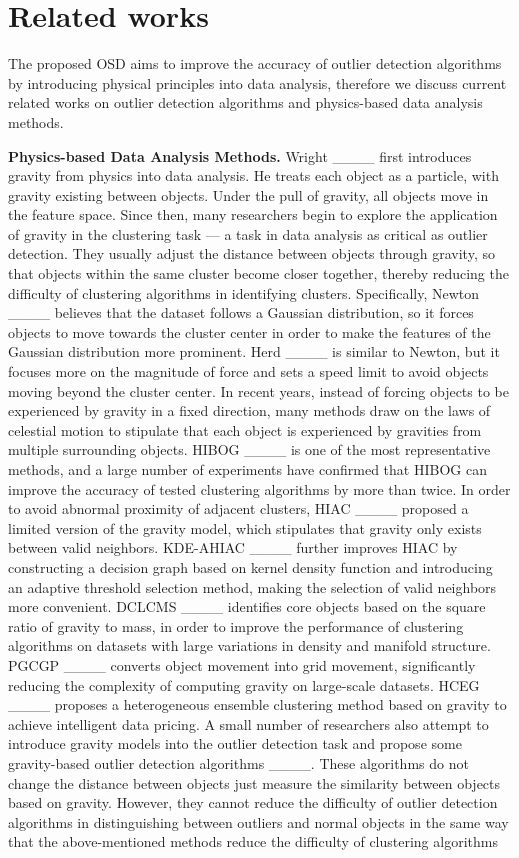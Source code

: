 \section{Related works}
\label{sec:Related works}
The proposed OSD aims to improve the accuracy of outlier detection algorithms by introducing physical principles into data analysis, therefore we discuss current related works on outlier detection algorithms and physics-based data analysis methods.

\textbf{Physics-based Data Analysis Methods.} Wright ____ first introduces gravity from physics into data analysis. He treats each object as a particle, with gravity existing between objects. Under the pull of gravity, all objects move in the feature space. Since then, many researchers begin to explore the application of gravity in the clustering task — a task in data analysis as critical as outlier detection. They usually adjust the distance between objects through gravity, so that objects within the same cluster become closer together, thereby reducing the difficulty of clustering algorithms in identifying clusters. Specifically, Newton ____ believes that the dataset follows a Gaussian distribution, so it forces objects to move towards the cluster center in order to make the features of the Gaussian distribution more prominent. Herd ____ is similar to Newton, but it focuses more on the magnitude of force and sets a speed limit to avoid objects moving beyond the cluster center. In recent years, instead of forcing objects to be experienced by gravity in a fixed direction, many methods draw on the laws of celestial motion to stipulate that each object is experienced by gravities from multiple surrounding objects. HIBOG ____ is one of the most representative methods, and a large number of experiments have confirmed that HIBOG can improve the accuracy of tested clustering algorithms by more than twice. In order to avoid abnormal proximity of adjacent clusters, HIAC ____ proposed a limited version of the gravity model, which stipulates that gravity only exists between valid neighbors. KDE-AHIAC ____ further improves HIAC by constructing a decision graph based on kernel density function and introducing an adaptive threshold selection method, making the selection of valid neighbors more convenient. DCLCMS ____ identifies core objects based on the square ratio of gravity to mass, in order to improve the performance of clustering algorithms on datasets with large variations in density and manifold structure. PGCGP ____ converts object movement into grid movement, significantly reducing the complexity of computing gravity on large-scale datasets. HCEG ____ proposes a heterogeneous ensemble clustering method based on gravity to achieve intelligent data pricing. A small number of researchers also attempt to introduce gravity models into the outlier detection task and propose some gravity-based outlier detection algorithms ____. These algorithms do not change the distance between objects just measure the similarity between objects based on gravity. However, they cannot reduce the difficulty of outlier detection algorithms in distinguishing between outliers and normal objects in the same way that the above-mentioned methods reduce the difficulty of clustering algorithms 